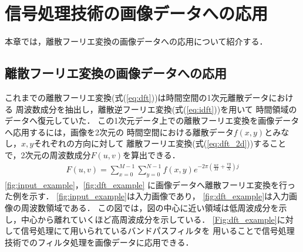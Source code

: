 \chapter{信号処理技術の画像データへの応用}

本章では，離散フーリエ変換の画像データへの応用について紹介する．

\section{離散フーリエ変換の画像データへの応用}

これまでの離散フーリエ変換(式(\ref{eq:dft}))は時間空間の1次元離散データにおける
周波数成分を抽出し，離散逆フーリエ変換(式(\ref{eq:idft}))を用いて
時間領域のデータへ復元していた．
この1次元データ上での離散フーリエ変換を画像データへ応用するには，画像を2次元の
時間空間における離散データ$f(x, y)$とみなし，$x, y$それぞれの方向に対して
離散フーリエ変換(式(\ref{eq:dft_2d}))することで，2次元の周波数成分$F(u, v)$を算出できる．
\begin{align}
  F(u, v) = \sum_{x = 0}^{M-1} \sum_{y = 0}^{N-1} f(x, y) e ^ {- 2 \pi \left(\frac{ux}{M} + \frac{vy}{N} \right) j} \label{eq:dft_2d}
\end{align}
\autoref{fig:input_example}，\autoref{fig:dft_example}
に画像データへ離散フーリエ変換を行った例を示す．
\autoref{fig:input_example}は入力画像であり，
\autoref{fig:dft_example}は入力画像の周波数領域である．
この図では，図の中心に近い領域は低周波成分を示し，中心から離れていくほど高周波成分を示している．
\autoref{Fig:dft_example}に対して信号処理にて用いられているバンドパスフィルタを
用いることで信号処理技術でのフィルタ処理を画像データに応用できる．

